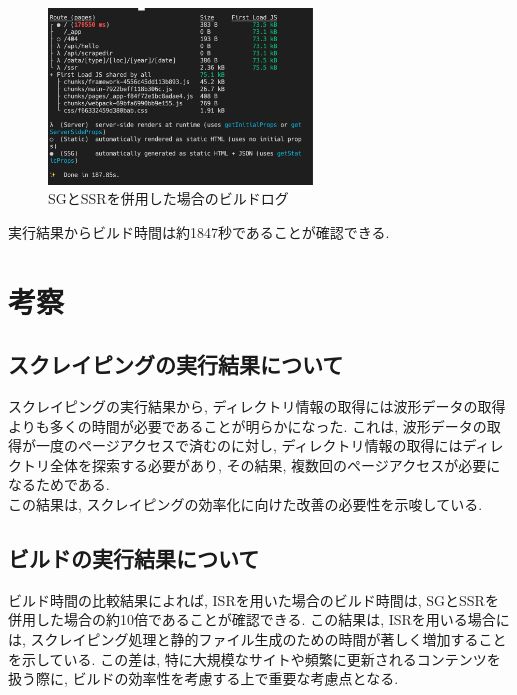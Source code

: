 \begin{figure}[htbp]
	\begin{center}
		\includegraphics[width=70mm]{./images/SGandSSR-log.png}
		\caption{SGとSSRを併用した場合のビルドログ}\label{fig:SG-SSR-build}
	\end{center}
\end{figure}

実行結果からビルド時間は約1847秒であることが確認できる.

\section{考察}
\subsection{スクレイピングの実行結果について}
スクレイピングの実行結果から, ディレクトリ情報の取得には波形データの取得よりも多くの時間が必要であることが明らかになった. 
これは, 波形データの取得が一度のページアクセスで済むのに対し, ディレクトリ情報の取得にはディレクトリ全体を探索する必要があり, その結果, 複数回のページアクセスが必要になるためである. \\
この結果は, スクレイピングの効率化に向けた改善の必要性を示唆している. 

\subsection{ビルドの実行結果について}
ビルド時間の比較結果によれば, ISRを用いた場合のビルド時間は, SGとSSRを併用した場合の約10倍であることが確認できる. 
この結果は, ISRを用いる場合には, スクレイピング処理と静的ファイル生成のための時間が著しく増加することを示している. 
この差は, 特に大規模なサイトや頻繁に更新されるコンテンツを扱う際に, ビルドの効率性を考慮する上で重要な考慮点となる. 

